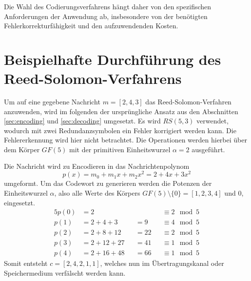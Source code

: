 Die Wahl des Codierungsverfahrens hängt daher von den spezifischen Anforderungen der Anwendung ab, insbesondere von der benötigten Fehlerkorrekturfähigkeit und den aufzuwendenden Kosten.

\section{Beispielhafte Durchführung des Reed-Solomon-Verfahrens}\label{app:example}

Um auf eine gegebene Nachricht $m=[2,4,3]$ das Reed-Solomon-Verfahren anzuwenden, wird im folgenden der ursprüngliche Ansatz aus den Abschnitten \ref{sec:encoding} und \ref{sec:decoding} umgesetzt.
Es wird $RS(5, 3)$ verwendet, wodurch mit zwei Redundanzsymbolen ein Fehler korrigiert werden kann.
Die Fehlererkennung wird hier nicht betrachtet.
Die Operationen werden hierbei über dem Körper $GF(5)$ mit der primitiven Einheitswurzel $\alpha=2$ ausgeführt.

Die Nachricht wird zu Encodieren in das Nachrichtenpolynom \[p(x)=m_0+m_1x+m_2x^2=2+4x+3x^2\] umgeformt.
Um das Codewort zu generieren werden die Potenzen der Einheitswurzel $\alpha$, also alle Werte des Körpers $GF(5)\setminus\{0\}=[1,2,3,4]$ und 0, eingesetzt.
\begin{alignat}{5}
p(0)&=2      &&    &&\equiv2\mod5 \nonumber\\
p(1)&=2+4+3  &&=9  &&\equiv4\mod5 \nonumber\\
p(2)&=2+8+12 &&=22 &&\equiv2\mod5 \nonumber\\
p(3)&=2+12+27&&=41 &&\equiv1\mod5 \nonumber\\
p(4)&=2+16+48&&=66 &&\equiv1\mod5 \nonumber
\end{alignat}
Somit entsteht $c=[2,4,2,1,1]$, welches nun im Übertragungskanal oder Speichermedium verfälscht werden kann.

